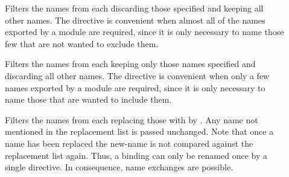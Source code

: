 \begin{optDefinition}
\begin{description}
    \item[] 
    Filters the names from each  discarding those
    specified and keeping all other names.  The  directive is
    convenient when almost all of the names exported by a module are required,
    since it is only necessary to name those few that are not wanted to exclude
    them.

    \item[]  Filters the
    names from each  keeping only those names specified
    and discarding all other names.  The  directive is
    convenient when only a few names exported by a module are required, since it
    is only necessary to name those that are wanted to include them.

    \item[] 
    Filters the names from each  replacing those with
     by .  Any name not mentioned in the replacement
    list is passed unchanged.  Note that once a name has been replaced the
    new-name is not compared against the replacement list again.  Thus, a
    binding can only be renamed once by a single  directive.
    In consequence, name exchanges are possible.
\end{description}
\end{optDefinition}
%

